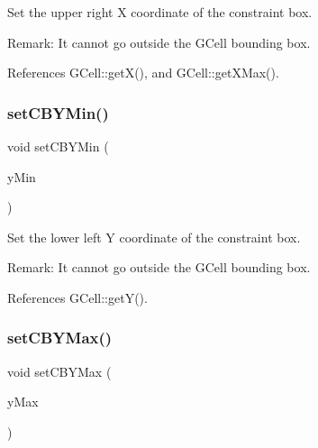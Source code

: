 Set the upper right X coordinate of the constraint box.

\begin{DoxyParagraph}{Remark\+: It cannot go outside the G\+Cell bounding box. }

\end{DoxyParagraph}


References G\+Cell\+::get\+X(), and G\+Cell\+::get\+X\+Max().

\mbox{\label{classKatabatic_1_1AutoContact_a5b598929b39ad3ec202405b31ac02b1d}} 
\subsubsection{\texorpdfstring{set\+C\+B\+Y\+Min()}{setCBYMin()}}
{\footnotesize\ttfamily void set\+C\+B\+Y\+Min (\begin{DoxyParamCaption}\item[{\textbf{ Db\+U\+::\+Unit}}]{y\+Min }\end{DoxyParamCaption})\hspace{0.3cm}{\ttfamily [inline]}}

Set the lower left Y coordinate of the constraint box.

\begin{DoxyParagraph}{Remark\+: It cannot go outside the G\+Cell bounding box. }

\end{DoxyParagraph}


References G\+Cell\+::get\+Y().

\mbox{\label{classKatabatic_1_1AutoContact_a1fdb3737d910a966e150a86d885f3c05}} 
\subsubsection{\texorpdfstring{set\+C\+B\+Y\+Max()}{setCBYMax()}}
{\footnotesize\ttfamily void set\+C\+B\+Y\+Max (\begin{DoxyParamCaption}\item[{\textbf{ Db\+U\+::\+Unit}}]{y\+Max }\end{DoxyParamCaption})\hspace{0.3cm}{\ttfamily [inline]}}

